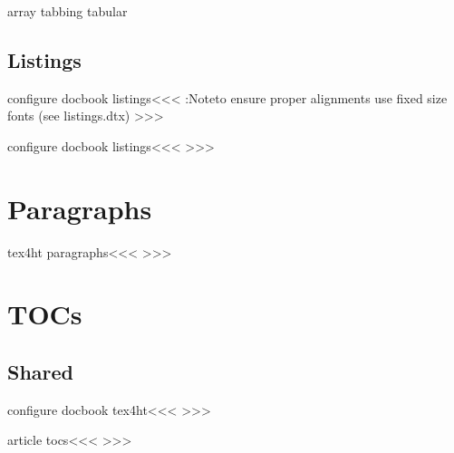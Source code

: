     array
    tabbing
    tabular
 

\subsection{Listings}

\<configure docbook listings\><<<
\Log:Note{to ensure proper alignments use
   fixed size fonts (see listings.dtx)}
   {\ifvmode \IgnorePar\fi \EndP 
    {\everypar{}\leavevmode}%
   }
   {{\everypar{}\leavevmode}}
   {}{}
   {}
   {}
>>>

\<configure docbook listings\><<<
   {\ifvmode \IgnorePar\fi \EndP  
    \bgroup 
         {{\everypar{}\leavevmode}}
         {{\everypar{}\leavevmode}}
         {}{}%
   }
   {\egroup \ifvmode \IgnorePar\fi \EndP   {}}
   {} {}
>>>


\section{Paragraphs}


\<tex4ht paragraphs\><<<
   {\EndP{}}
   {\EndP{}}    
   {}     {}    
>>>


\section{TOCs}


\subsection{Shared}




\<configure docbook tex4ht\><<<
>>>




\<article tocs\><<<
  {\ifvmode \IgnorePar\fi \EndP{}}
  {\ifvmode \IgnorePar\fi \EndP{}}
  {}{}{}
>>>



